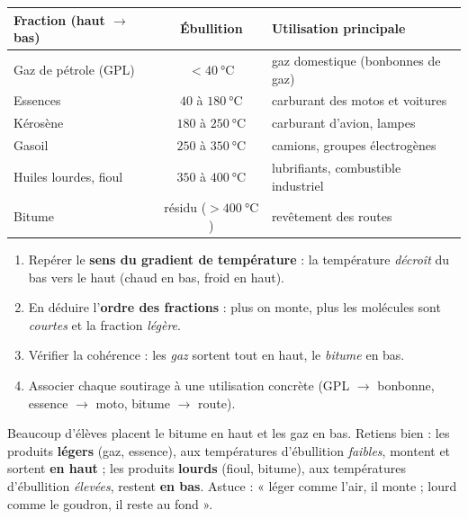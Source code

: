 \documentclass[11pt]{article}
\begin{document}
\begin{center}
\begin{tabularx}{\linewidth}{|l|c|X|}\hline
\rowcolor{popblueL} \textbf{Fraction (haut $\to$ bas)} & \textbf{Ébullition} & \textbf{Utilisation principale} \\ \hline
Gaz de pétrole (GPL) & $< \SI{40}{\celsius}$ & gaz domestique (bonbonnes de gaz) \\ \hline
Essences & $40$ à $\SI{180}{\celsius}$ & carburant des motos et voitures \\ \hline
Kérosène & $180$ à $\SI{250}{\celsius}$ & carburant d'avion, lampes \\ \hline
Gasoil & $250$ à $\SI{350}{\celsius}$ & camions, groupes électrogènes \\ \hline
Huiles lourdes, fioul & $350$ à $\SI{400}{\celsius}$ & lubrifiants, combustible industriel \\ \hline
Bitume & résidu ($> \SI{400}{\celsius}$) & revêtement des routes \\ \hline
\end{tabularx}
\end{center}

\begin{methode}
\begin{enumerate}
\item Repérer le \textbf{sens du gradient de température} : la température \emph{décroît} du bas vers le haut (chaud en bas, froid en haut).
\item En déduire l'\textbf{ordre des fractions} : plus on monte, plus les molécules sont \emph{courtes} et la fraction \emph{légère}.
\item Vérifier la cohérence : les \emph{gaz} sortent tout en haut, le \emph{bitume} en bas.
\item Associer chaque soutirage à une utilisation concrète (GPL $\to$ bonbonne, essence $\to$ moto, bitume $\to$ route).
\end{enumerate}
\end{methode}

\begin{attention}
Beaucoup d'élèves placent le bitume en haut et les gaz en bas. Retiens bien : les produits \textbf{légers} (gaz, essence), aux températures d'ébullition \emph{faibles}, montent et sortent \textbf{en haut} ; les produits \textbf{lourds} (fioul, bitume), aux températures d'ébullition \emph{élevées}, restent \textbf{en bas}. Astuce : « léger comme l'air, il monte ; lourd comme le goudron, il reste au fond ».
\end{attention}
\end{document}
